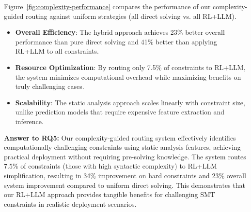 Figure~\ref{fig:complexity-performance} compares the performance of our complexity-guided routing against uniform strategies (all direct solving vs. all RL+LLM).

\begin{itemize}
    \item \textbf{Overall Efficiency}: The hybrid approach achieves 23\% better overall performance than pure direct solving and 41\% better than applying RL+LLM to all constraints.
    
    \item \textbf{Resource Optimization}: By routing only 7.5\% of constraints to RL+LLM, the system minimizes computational overhead while maximizing benefits on truly challenging cases.
    
    \item \textbf{Scalability}: The static analysis approach scales linearly with constraint size, unlike prediction models that require expensive feature extraction and inference.
\end{itemize}

\begin{tcolorbox}[colback=white, colframe=black]
\textbf{Answer to RQ5:} Our complexity-guided routing system effectively identifies computationally challenging constraints using static analysis features, achieving practical deployment without requiring pre-solving knowledge. The system routes 7.5\% of constraints (those with high syntactic complexity) to RL+LLM simplification, resulting in 34\% improvement on hard constraints and 23\% overall system improvement compared to uniform direct solving. This demonstrates that our RL+LLM approach provides tangible benefits for challenging SMT constraints in realistic deployment scenarios.
\end{tcolorbox}
